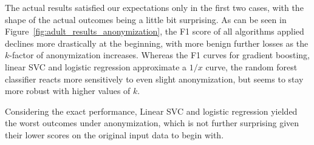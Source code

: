 \documentclass{llncs}
\begin{document}
The actual results satisfied our expectations only in the first two cases, with the shape of the actual outcomes being a little bit surprising. As can be seen in Figure~\ref{fig:adult_results_anonymization}, the F1 score of all algorithms applied declines more drastically at the beginning, with more benign further losses as the $k$-factor of anonymization increases. Whereas the F1 curves for gradient boosting, linear SVC and logistic regression approximate a $1/x$ curve, the random forest classifier reacts more sensitively to even slight anonymization, but seems to stay more robust with higher values of $k$.

Considering the exact performance, Linear SVC and logistic regression yielded the worst outcomes under anonymization, which is not further surprising given their lower scores on the original input data to begin with.
\end{document}
